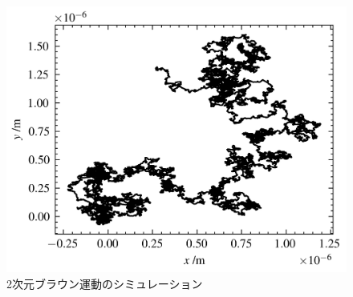 \begin{figure}
    \centering
    \includegraphics[width=0.8\linewidth]{./src/figures/brownian-2d-sim/brownian-2d-sim.png}
    \caption{2次元ブラウン運動のシミュレーション}\label{fig:brownian-2d-sim}
\end{figure}
